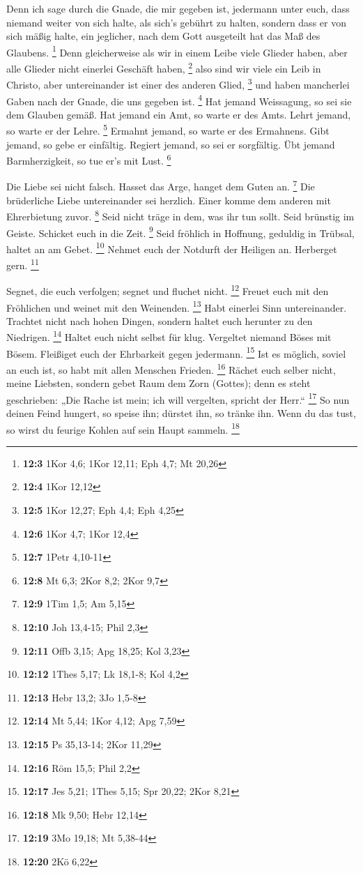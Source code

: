  Denn ich sage durch die Gnade, die mir gegeben ist,
jedermann unter euch, dass niemand weiter von sich halte, als sich's
gebührt zu halten, sondern dass er von sich mäßig halte, ein jeglicher,
nach dem Gott ausgeteilt hat das Maß des Glaubens. \footnote{\textbf{12:3}
  1Kor 4,6; 1Kor 12,11; Eph 4,7; Mt 20,26}  Denn
gleicherweise als wir in einem Leibe viele Glieder haben, aber alle
Glieder nicht einerlei Geschäft haben, \footnote{\textbf{12:4} 1Kor
  12,12}  also sind wir viele ein Leib in Christo, aber
untereinander ist einer des anderen Glied, \footnote{\textbf{12:5} 1Kor
  12,27; Eph 4,4; Eph 4,25}  und haben mancherlei Gaben
nach der Gnade, die uns gegeben ist. \footnote{\textbf{12:6} 1Kor 4,7;
  1Kor 12,4}  Hat jemand Weissagung, so sei sie dem
Glauben gemäß. Hat jemand ein Amt, so warte er des Amts. Lehrt jemand,
so warte er der Lehre. \footnote{\textbf{12:7} 1Petr 4,10-11}
 Ermahnt jemand, so warte er des Ermahnens. Gibt jemand,
so gebe er einfältig. Regiert jemand, so sei er sorgfältig. Übt jemand
Barmherzigkeit, so tue er's mit Lust. \footnote{\textbf{12:8} Mt 6,3;
  2Kor 8,2; 2Kor 9,7}

 Die Liebe sei nicht falsch. Hasset das Arge, hanget dem
Guten an. \footnote{\textbf{12:9} 1Tim 1,5; Am 5,15}  Die
brüderliche Liebe untereinander sei herzlich. Einer komme dem anderen
mit Ehrerbietung zuvor. \footnote{\textbf{12:10} Joh 13,4-15; Phil 2,3}
 Seid nicht träge in dem, was ihr tun sollt. Seid
brünstig im Geiste. Schicket euch in die Zeit. \footnote{\textbf{12:11}
  Offb 3,15; Apg 18,25; Kol 3,23}  Seid fröhlich in
Hoffnung, geduldig in Trübsal, haltet an am Gebet. \footnote{\textbf{12:12}
  1Thes 5,17; Lk 18,1-8; Kol 4,2}  Nehmet euch der
Notdurft der Heiligen an. Herberget gern. \footnote{\textbf{12:13} Hebr
  13,2; 3Jo 1,5-8}

 Segnet, die euch verfolgen; segnet und fluchet nicht.
\footnote{\textbf{12:14} Mt 5,44; 1Kor 4,12; Apg 7,59} 
Freuet euch mit den Fröhlichen und weinet mit den Weinenden. \footnote{\textbf{12:15}
  Ps 35,13-14; 2Kor 11,29}  Habt einerlei Sinn
untereinander. Trachtet nicht nach hohen Dingen, sondern haltet euch
herunter zu den Niedrigen. \footnote{\textbf{12:16} Röm 15,5; Phil 2,2}
 Haltet euch nicht selbst für klug. Vergeltet niemand
Böses mit Bösem. Fleißiget euch der Ehrbarkeit gegen jedermann.
\footnote{\textbf{12:17} Jes 5,21; 1Thes 5,15; Spr 20,22; 2Kor 8,21}
 Ist es möglich, soviel an euch ist, so habt mit allen
Menschen Frieden. \footnote{\textbf{12:18} Mk 9,50; Hebr 12,14}
 Rächet euch selber nicht, meine Liebsten, sondern gebet
Raum dem Zorn (Gottes); denn es steht geschrieben: „Die Rache ist mein;
ich will vergelten, spricht der Herr.`` \footnote{\textbf{12:19} 3Mo
  19,18; Mt 5,38-44}  So nun deinen Feind hungert, so
speise ihn; dürstet ihn, so tränke ihn. Wenn du das tust, so wirst du
feurige Kohlen auf sein Haupt sammeln. \footnote{\textbf{12:20} 2Kö 6,22}

